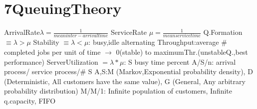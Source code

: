\section{7QueuingTheory}
ArrivalRate$\lambda=\frac{1}{mean inter-arrival time}$
\textbar
ServiceRate $\mu=\frac{1}{mean service time}$
\textbar
Q.Formation $\equiv \lambda > \mu$
\textbar
Stability $\equiv \lambda < \mu$: busy,idle alternating
\textbar
Throughput:average \# completed jobs per unit of time $\rightarrow$ 0(stable) to maximumThr.(unstableQ.,best performance) 
\textbar
ServerUtilization $= \lambda * \mu$: S busy time percent
\textbar
A/S/n: arrival process/ service process/\# S
\textbar A,S:M (Markov,Exponential probability density),
D (Deterministic, All customers have the same value),
G (General, Any arbitrary probability distribution)
\textbar
M/M/1: Infinite population of customers, Infinite q.capacity, FIFO